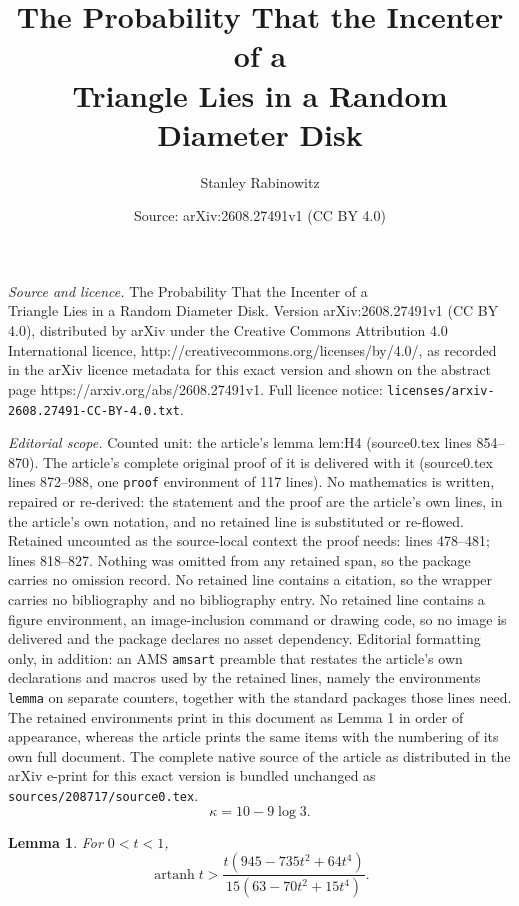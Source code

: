 \documentclass[10pt,a4paper]{amsart}
\title{The Probability That the Incenter of a\\Triangle Lies in a Random Diameter Disk}
\author{Stanley Rabinowitz}
\date{Source: arXiv:2608.27491v1 (CC BY 4.0)}
\newtheorem{lemma}{Lemma}
\newcommand{\artanh}{\operatorname{artanh}}
\begin{document}
\maketitle

\noindent\emph{Source and licence.} The Probability That the Incenter of a\\Triangle Lies in a Random Diameter Disk. Version arXiv:2608.27491v1 (CC BY 4.0), distributed by arXiv under the Creative Commons Attribution 4.0 International licence, http://creativecommons.org/licenses/by/4.0/, as recorded in the arXiv licence metadata for this exact version and shown on the abstract page https://arxiv.org/abs/2608.27491v1. Full licence notice: \texttt{licenses/arxiv-2608.27491-CC-BY-4.0.txt}.\par\smallskip

\noindent\textit{Editorial scope.} Counted unit: the article's lemma lem:H4 (source0.tex lines 854--870). The article's complete original proof of it is delivered with it (source0.tex lines 872--988, one \texttt{proof} environment of 117 lines). No mathematics is written, repaired or re-derived: the statement and the proof are the article's own lines, in the article's own notation, and no retained line is substituted or re-flowed.  Retained uncounted as the source-local context the proof needs: lines 478--481; lines 818--827.  Nothing was omitted from any retained span, so the package carries no omission record.  No retained line contains a citation, so the wrapper carries no bibliography and no bibliography entry.  No retained line contains a figure environment, an image-inclusion command or drawing code, so no image is delivered and the package declares no asset dependency.  Editorial formatting only, in addition: an AMS \texttt{amsart} preamble that restates the article's own declarations and macros used by the retained lines, namely the environments \texttt{lemma} on separate counters, together with the standard packages those lines need.  The retained environments print in this document as Lemma 1 in order of appearance, whereas the article prints the same items with the numbering of its own full document.  The complete native source of the article as distributed in the arXiv e-print for this exact version is bundled unchanged as \texttt{sources/208717/source0.tex}.
\begin{equation}
\label{eq:kappa}
\kappa=10-9\log3.
\end{equation}

\begin{lemma}
\label{lem:atanhbound}
For $0<t<1$,
\begin{equation}
\label{eq:atanhbound}
\artanh t
>
\frac{t(945-735t^2+64t^4)}{15(63-70t^2+15t^4)}.
\end{equation}
\end{lemma}
\end{document}

